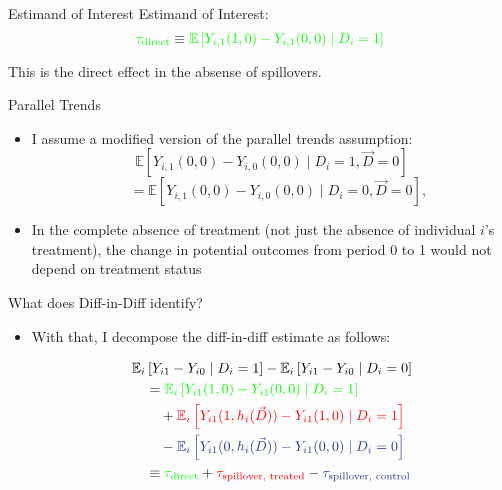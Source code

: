 \documentclass[aspectratio=43]{beamer}
\begin{document}
\begin{frame}{Estimand of Interest}
    Estimand of Interest: \[ 
        \textcolor{green}{\tau_{\text{direct}}} \equiv \textcolor{green}{\mathbb{E}\left[ Y_{i,1}(1, 0) - Y_{i,1}(0, 0) \mid D_i = 1\right]}
    \]

    This is the direct effect in the absense of spillovers.
\end{frame}

\begin{frame}{Parallel Trends}
    \begin{itemize}
        \item I assume a modified version of the parallel trends assumption: \[
            \mathbb{E}\left[ Y_{i,1}(0, 0) - Y_{i,0}(0, 0) \mid D_i = 1, \vec{D} = 0 \right] 
        \] \[
            \quad =
            \mathbb{E}\left[ Y_{i,1}(0, 0) - Y_{i,0}(0, 0) \mid D_i = 0, \vec{D} = 0 \right],
        \]

        \item In the complete absence of treatment (not just the absence of individual $i$'s treatment), the change in potential outcomes from period 0 to 1 would not depend on treatment status
    \end{itemize}
\end{frame}

\begin{frame}{What does Diff-in-Diff identify?}
    \begin{itemize}
        \item With that, I decompose the diff-in-diff estimate as follows: 
        
        \begin{align*}
            &\mathbb{E}_i \left[ Y_{i1} - Y_{i0} \mid D_i = 1 \right] - \mathbb{E}_i \left[ Y_{i1} - Y_{i0} \mid D_i = 0 \right] \\
            &\quad = 
            \textcolor{green}{\mathbb{E}_i \left[ Y_{i1}(1, 0) - Y_{i1}(0, 0) \mid D_i = 1 \right]} \\
            &\quad\quad + 
            \textcolor{red}{\mathbb{E}_i \left[ Y_{i1}(1, h_i(\vec{D})) - Y_{i1}(1, 0) \mid D_i = 1 \right]} \\ 
            &\quad\quad - 
            \textcolor{purple}{\mathbb{E}_i \left[ Y_{i1}(0, h_i(\vec{D})) - Y_{i1}(0, 0) \mid D_i = 0 \right]} \\
            &\quad \equiv \textcolor{green}{\tau_{\text{direct}}} + \textcolor{red}{\tau_{\text{spillover, treated}}} - \textcolor{purple}{\tau_{\text{spillover, control}}}
        \end{align*}

    \end{itemize}
\end{frame}
\end{document}
